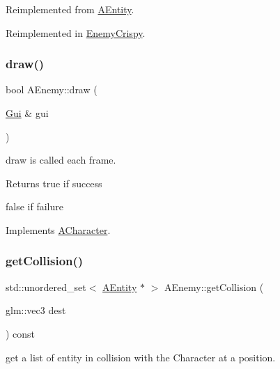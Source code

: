 Reimplemented from \hyperlink{class_a_entity_ac1fd0bdb4c01a4767660f03cd06cd2ac}{A\+Entity}.



Reimplemented in \hyperlink{class_enemy_crispy_a32d938b70f4b0f2bd2e1df606c812d13}{Enemy\+Crispy}.

\mbox{\label{class_a_enemy_a527fc4b7bb46c04c486fd025a01e16a9}} 
\subsubsection{\texorpdfstring{draw()}{draw()}}
{\footnotesize\ttfamily bool A\+Enemy\+::draw (\begin{DoxyParamCaption}\item[{\hyperlink{class_gui}{Gui} \&}]{gui }\end{DoxyParamCaption})\hspace{0.3cm}{\ttfamily [virtual]}}



draw is called each frame. 

\begin{DoxyReturn}{Returns}
true if success 

false if failure 
\end{DoxyReturn}


Implements \hyperlink{class_a_character_af223d3c9dbd3143daf62e9834bd30e3d}{A\+Character}.

\mbox{\label{class_a_enemy_aca840427bf701f3c24b38a4c17a14cfd}} 
\subsubsection{\texorpdfstring{get\+Collision()}{getCollision()}}
{\footnotesize\ttfamily std\+::unordered\+\_\+set$<$ \hyperlink{class_a_entity}{A\+Entity} $\ast$ $>$ A\+Enemy\+::get\+Collision (\begin{DoxyParamCaption}\item[{glm\+::vec3}]{dest }\end{DoxyParamCaption}) const\hspace{0.3cm}{\ttfamily [virtual]}}



get a list of entity in collision with the Character at a position. 


